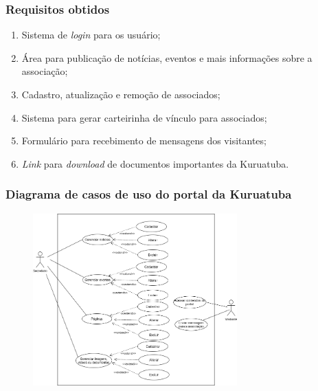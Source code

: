 \documentclass{beamer}
\begin{document}
\begin{frame}
    \frametitle{Requisitos obtidos} %
    \begin{enumerate}
     \item Sistema de \textit{login} para os usuário;
     \item Área para publicação de notícias, eventos e mais informações sobre a associação;
     \item Cadastro, atualização e remoção de associados;
     \item Sistema para gerar carteirinha de vínculo para associados;
     \item Formulário para recebimento de mensagens dos visitantes;
     \item \textit{Link} para \textit{download} de documentos importantes da Kuruatuba.
    \end{enumerate}

\end{frame}


\begin{frame}
    \frametitle{Diagrama de casos de uso do portal da Kuruatuba}
    \begin{figure}[htb]
        \centering
        
        \includegraphics[width=0.7\textwidth]{figuras/use-case-portal-1.png}
        
        \label{use-case-portal}
    \end{figure}
\end{frame}
\end{document}
